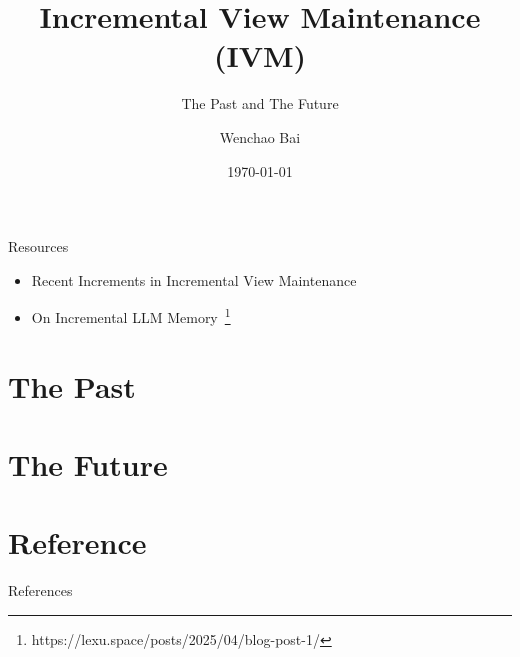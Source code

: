 \documentclass[aspectratio=169]{beamer}
\title{Incremental View Maintenance (IVM)}
\subtitle{The Past and The Future}
\author{Wenchao Bai}
\institute{wbai@seu.edu.cn}
\date{\today}
\begin{document}
\begin{frame}
    \titlepage
\end{frame}


\begin{frame}{Resources}

\begin{itemize}
  \item Recent Increments in Incremental View Maintenance~\cite{ivm_survey_pods}
  \item On Incremental LLM Memory~\footnote{https://lexu.space/posts/2025/04/blog-post-1/}
\end{itemize}

\end{frame}


\section{The Past}



\section{The Future}





\section*{Reference}
\begin{frame}[allowframebreaks]{References}
    \renewcommand{\refname}{} 
     
    
\end{frame}
\end{document}
